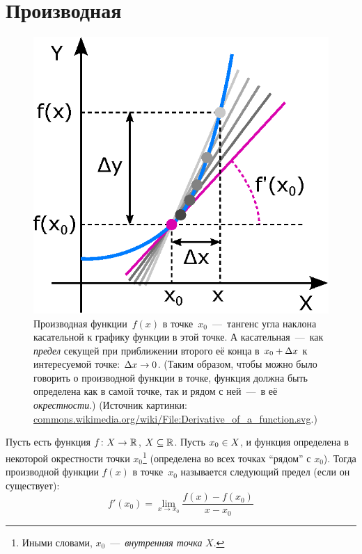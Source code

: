 \documentclass[a4paper,12pt]{article}
\begin{document}
  
  
  
  \section{Производная}
  

  \begin{figure}[ht]
    \centering
    \includegraphics[width=0.8\linewidth]{images/Derivative_of_a_function}
    
    \caption{
      Производная функции~$f(x)$ в точке~$x_0$~---~тангенс угла наклона касательной к графику функции в этой точке.
      А касательная~---~как \emph{предел} секущей при приближении второго её конца в $x_0 \hm+ \Dt x$ к интересуемой точке: $\Dt x \hm\to 0$.
      (Таким образом, чтобы можно было говорить о производной функции в точке, функция должна быть определена как в самой точке, так и рядом с ней~---~в её \emph{окрестности}.)
      (Источник картинки: \href{https://commons.wikimedia.org/wiki/File:Derivative\_of\_a\_function.svg}{commons.wikimedia.org/wiki/File:Derivative\_of\_a\_function.svg}.)
    }
    \label{fig:derivative}
  \end{figure}
  
  Пусть есть функция $f\hm\colon X \hm\to \RR$, $X \hm\subseteq \RR$.
  Пусть $x_0 \hm\in X$, и функция определена в некоторой окрестности точки $x_0$\footnote{Иными словами, $x_0$~---~\emph{внутренняя точка} $X$.} (определена во всех точках ``рядом'' с $x_0$).
  Тогда производной функции $f(x)$ в точке~$x_0$ называется следующий предел (если он существует):
  \[
    f'(x_0) = \lim_{x \to x_0} \frac{f(x) - f(x_0)}{x - x_0}
  \]
  
\end{document}

